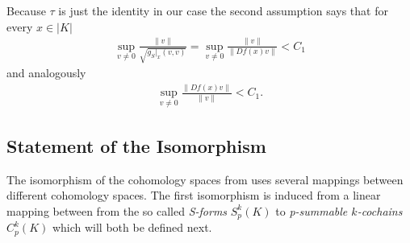 \documentclass[12pt,a4paper]{article}
\theoremstyle{definition}
\newcommand{\real}{\mathbb{R}}
\begin{document}
Because $\tau$ is just the identity in our case 
the second assumption says that for every 
$x \in |K|$
\begin{align*}
\sup\limits_{v \neq 0} \frac{\lVert v \rVert}{\sqrt{g_S|_x(v,v)}} =
\sup\limits_{v \neq 0} \frac{\lVert v \rVert}{\lVert Df(x)v\rVert} < C_1
\end{align*}
and analogously
\begin{align*}
    \sup\limits_{v \neq 0} \frac{\lVert Df(x)v\rVert}{\lVert v \rVert} < C_1.
\end{align*}



\subsection{Statement of the Isomorphism} \label{sec_isomorphism_cohomology}

The isomorphism of the cohomology spaces from \cite{goldshtein} uses several
mappings between different cohomology spaces. 
The first isomorphism is induced from a linear mapping
between from the so called \textit{S-forms} 
$S_p^k(K)$ to \textit{p-summable $k$-cochains} $C_p^k(K)$ which will both 
be defined next.
\end{document}
